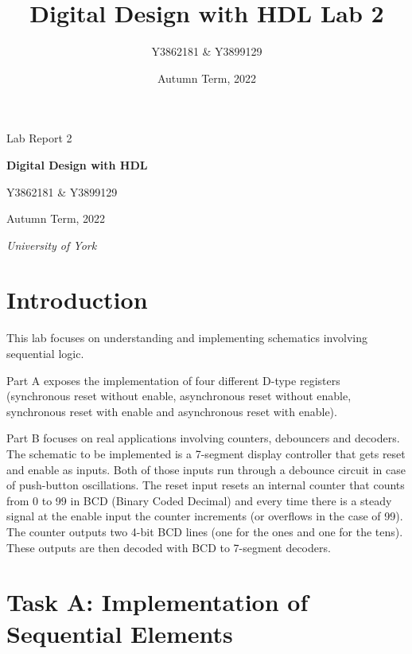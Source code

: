 \documentclass[10pt]{article}
\title{Digital Design with HDL Lab 2}
\author{Y3862181 \& Y3899129}
\date{Autumn Term, 2022}
\begin{document}
\begin{titlepage}
\centering
{\Huge Lab Report 2}

\vspace{3cm}

{\LARGE \textbf{ Digital Design with HDL}}

\vspace{3cm}

{\huge Y3862181 \& Y3899129}

\vspace{2cm}


{\large Autumn Term, 2022}
\vfill

{\itshape University of York}
\end{titlepage}

\tableofcontents
\newpage

\pagestyle{content}
\section{Introduction}
This lab focuses on understanding and implementing schematics involving sequential logic.

Part A exposes the implementation of four different D-type registers (synchronous reset without enable, asynchronous reset without enable, synchronous reset with enable and asynchronous reset with enable).

Part B focuses on real applications involving counters, debouncers and decoders. The schematic to be implemented is a 7-segment display controller that gets reset and enable as inputs. Both of those inputs run through a debounce circuit in case of push-button oscillations. The reset input resets an internal counter that counts from 0 to 99 in BCD (Binary Coded Decimal) and every time there is a steady signal at the enable input the counter increments (or overflows in the case of 99). The counter outputs two 4-bit BCD lines (one for the ones and one for the tens). These outputs are then decoded with BCD to 7-segment decoders. 




\newpage

\section{Task A: Implementation of Sequential Elements}
\end{document}
